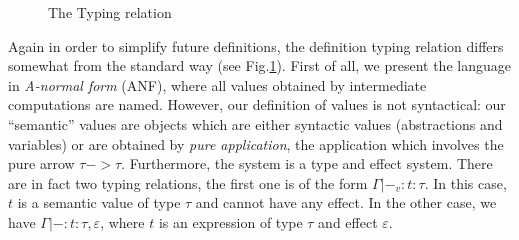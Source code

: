 \documentclass[a4paper]{llncs}
\newcommand{\letml}{{\bf let}}
\newcommand{\inml}{{\bf in}}
\newcommand{\ifml}{{\bf if}}
\newcommand{\thenml}{{\bf then}}
\newcommand{\elseml}{{\bf else}}
\newcommand{\propml}{{\bf prop}}
\newcommand{\boolml}{{\bf bool}}
\newcommand{\recml}{{\bf rec}}
\newcommand{\efft}[1]{ \langle #1 \rangle }
\newcommand{\alist}[1]{ \overline{#1} }
\begin{document}
\begin{figure}[htpb]
  \caption{The Typing relation}
  \label{fig:typing}
\end{figure}

Again in order to simplify future definitions, the definition typing relation
differs somewhat from the standard way (see Fig.\ref{fig:typing}). First of
all, we present the language in {\em A-normal form} (ANF), where all values
obtained by intermediate computations are named. However, our definition of
values is not syntactical: our ``semantic'' values are objects which are
either syntactic values (abstractions and variables) or are obtained by {\em
pure application}, the application which involves the pure arrow $τ->τ$.
Furthermore, the system is a type and effect system. There are in fact two
typing relations, the first one is of the form $Γ|-_v : t : τ$. In this case,
$t$ is a semantic value of type $τ$ and cannot have any effect. In the other
case, we have $Γ|- : t : τ, ε$, where $t$ is an expression of type $τ$ and
effect $ε$. 
\end{document}
